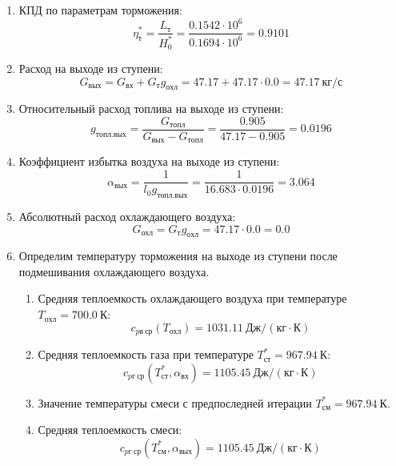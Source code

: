 \documentclass[a4paper,12pt]{article}
\begin{document}
\begin{enumerate}
        \item КПД по параметрам торможения:
        \[
            \eta_т^* = \frac{ L_т }{ H_0^* } =
                \frac{
                    0.1542 \cdot 10^6
                }{
                    0.1694 \cdot 10^6 } =
            0.9101
        \]

        \item Расход на выходе из ступени:
        \[
            G_{вых} = G_{вх} + G_т g_{охл} =
                47.17 + 47.17 \cdot
                0.0 =
            47.17 \ кг/с
        \]

        \item Относительный расход топлива на выходе из ступени:
        \[
            g_{топл.вых} = \frac{ G_{топл} }{ G_{вых} - G_{топл} } =
                 \frac{ 0.905 }{ 47.17 - 0.905 } =
            0.0196
        \]

        \item Коэффициент избытка воздуха на выходе из ступени:
        \[
            \alpha_{вых} = \frac{ 1 }{ l_0 g_{топл.вых} } =
                \frac{ 1 }{ 16.683 \cdot 0.0196 } =
            3.064
        \]

        \item Абсолютный расход охлаждающего воздуха:
        \[
            G_{охл} = G_т g_{охл} = 47.17 \cdot 0.0 =
            0.0
        \]

        \item Определим температуру торможения на выходе из ступени после подмешивания охлаждающего воздуха.
        \begin{enumerate}

            \item Средняя теплоемкость охлаждающего воздуха при температуре $T_{охл} = 700.0\ К $:
            \[
                c_{pв\ ср} (T_{охл}) = 1031.11\ Дж/ (кг \cdot К)
            \]

            \item Средняя теплоемкость газа при температуре $T_{ст}^* = 967.94 \ К $:
            \[
                c_{pг\ ср} (T_{ст}^*, \alpha_{вх}) =
                1105.45\ Дж/ (кг \cdot К)
            \]

            \item Значение температуры смеси с предпоследней итерации $T_{см}^{*} = 967.94\ К$.

            \item Средняя теплоемкость смеси:
            \[
                c_{pг\ ср} (T_{см}^{*}, \alpha_{вых}) =
                1105.45\ Дж/ (кг \cdot К)
            \]


\end{enumerate}
\end{enumerate}
\end{document}
